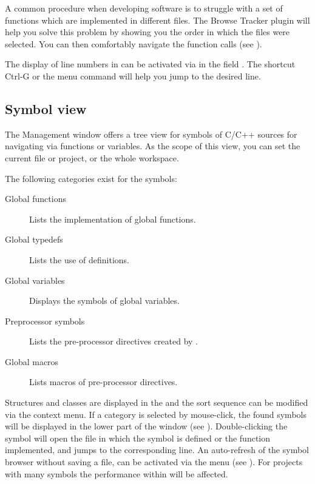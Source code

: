 A common procedure when developing software is to struggle with a set of functions which are implemented in different files. The Browse Tracker plugin will help you solve this problem by showing you the order in which the files were selected. You can then comfortably navigate the function calls (see ).

The display of line numbers in \codeblocks can be activated via  in the field . The shortcut Ctrl-G or the menu command  will help you jump to the desired line.


\subsection{Symbol view}

The \codeblocks Management window offers a tree view for symbols of C/C++ sources for navigating via functions or variables. As the scope of this view, you can set the current file or project, or the whole workspace.


The following categories exist for the symbols:

\begin{description}
\item[Global functions] Lists the implementation of global functions.
\item[Global typedefs] Lists the use of  definitions.
\item[Global variables] Displays the symbols of global variables.
\item[Preprocessor symbols] Lists the pre-processor directives created by .
\item[Global macros] Lists macros of pre-processor directives.
\end{description}


Structures and classes are displayed in the  and the sort sequence can be modified via the context menu. If a category is selected by mouse-click, the found symbols will be displayed in the lower part of the window (see ). Double-clicking the symbol will open the file in which the symbol is defined or the function implemented, and jumps to the corresponding line. An auto-refresh of the symbol browser without saving a file, can be activated via the menu   (see ). For projects with many symbols the performance within \codeblocks will be affected.

